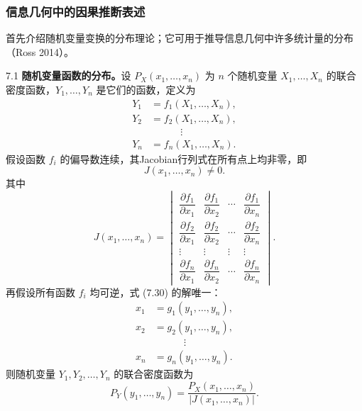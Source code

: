 \subsubsection{信息几何中的因果推断表述}
首先介绍随机变量变换的分布理论；它可用于推导信息几何中许多统计量的分布（Ross 2014）。

\begin{booktheorem}{7.1}
\textbf{随机变量函数的分布。}设 $P_X(x_1,\ldots,x_n)$ 为 $n$ 个随机变量 $X_1,\ldots,X_n$ 的联合密度函数，$Y_1,\ldots,Y_n$ 是它们的函数，定义为
\begin{equation}
\begin{aligned}
Y_1&=f_1(X_1,\ldots,X_n),\\
Y_2&=f_2(X_1,\ldots,X_n),\\
&\hspace{3em}\vdots\\
Y_n&=f_n(X_1,\ldots,X_n).
\end{aligned}
\tag{7.30}
\end{equation}
假设函数 $f_i$ 的偏导数连续，其Jacobian行列式在所有点上均非零，即
\[
J(x_1,\ldots,x_n)\ne0.
\]
其中
\[
J(x_1,\ldots,x_n)=\begin{vmatrix}
\dfrac{\partial f_1}{\partial x_1}&\dfrac{\partial f_1}{\partial x_2}&\cdots&\dfrac{\partial f_1}{\partial x_n}\\[5pt]
\dfrac{\partial f_2}{\partial x_1}&\dfrac{\partial f_2}{\partial x_2}&\cdots&\dfrac{\partial f_2}{\partial x_n}\\
\vdots&\vdots&\vdots&\vdots\\
\dfrac{\partial f_n}{\partial x_1}&\dfrac{\partial f_n}{\partial x_2}&\cdots&\dfrac{\partial f_n}{\partial x_n}
\end{vmatrix}.
\]
再假设所有函数 $f_i$ 均可逆，式 (7.30) 的解唯一：
\begin{equation}
\begin{aligned}
x_1&=g_1(y_1,\ldots,y_n),\\
x_2&=g_2(y_1,\ldots,y_n),\\
&\hspace{3em}\vdots\\
x_n&=g_n(y_1,\ldots,y_n).
\end{aligned}
\tag{7.31}
\end{equation}
则随机变量 $Y_1,Y_2,\ldots,Y_n$ 的联合密度函数为
\begin{equation}
P_Y(y_1,\ldots,y_n)=\frac{P_X(x_1,\ldots,x_n)}{|J(x_1,\ldots,x_n)|}.
\tag{7.32}
\end{equation}
\end{booktheorem}

